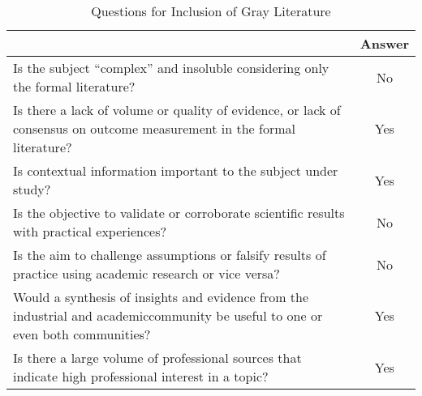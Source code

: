 \begin{table}
  \centering
  \caption{Questions for Inclusion of Gray Literature}
  \label{tab:questoesgarousi}
  \footnotesize
  \begin{tabular}{p{12cm}|c}
    \bottomrule
    \rowcolor[rgb]{0.753,0.753,0.753} \multicolumn{1}{c|}{\textbf{Question}}                                                                    & \textbf{Answer} \\
    \hline
    \rowcolor[rgb]{0.898,0.898,0.898} Is the subject “complex” and insoluble considering only the formal literature?                            & No              \\
    Is there a lack of volume or quality of evidence, or lack of consensus on outcome measurement in the formal literature?                     & Yes             \\
    \rowcolor[rgb]{0.898,0.898,0.898} Is contextual information important to the subject under study?                                           & Yes             \\
    Is the objective to validate or corroborate scientific results with practical experiences?                                                  & No              \\
    \rowcolor[rgb]{0.898,0.898,0.898} Is the aim to challenge assumptions or falsify results of practice using academic research or vice versa? & No              \\
    Would a synthesis of insights and evidence from the industrial and academiccommunity be useful to one or even both communities?             & Yes             \\
    \rowcolor[rgb]{0.898,0.898,0.898} Is there a large volume of professional sources that indicate high professional interest in a topic?      & Yes             \\
    \toprule
  \end{tabular}
\end{table}